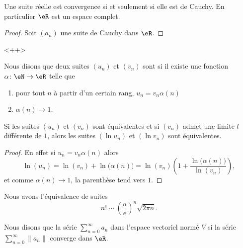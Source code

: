 \begin{theorem}  \label{ThoHGyzAva}
    Une suite réelle est convergence si et seulement si elle est de Cauchy. En particulier \( \eR\) est un espace complet.
\end{theorem}

\begin{proof}
    Soit \( (a_n)\) une suite de Cauchy dans \( \eR\).   
\end{proof}
<++>

\begin{definition}
    Nous disons que deux suites \( (u_n)\) et \( (v_n)\) sont  si il existe une fonction \( \alpha\colon \eN\to \eR\) telle que
    \begin{enumerate}
        \item
            pour tout \( n\) à partir d'un certain rang, \( u_n=v_n\alpha(n)\)
        \item
            \( \alpha(n)\to 1\).
    \end{enumerate}
\end{definition}

\begin{lemma}
    Si les suites \( (u_n)\) et \( (v_n)\) sont équivalentes et si \( (v_n)\) admet une limite \( l\) différente de \( 1\), alors les suites \( (\ln u_n)\) et \( (\ln v_n)\) sont équivalentes.
\end{lemma}

\begin{proof}
    En effet si \( u_n=v_n\alpha(n)\) alors
    \begin{equation}
        \ln(u_n)=\ln(v_n)+\ln\big( \alpha(n) \big)=\ln(v_n)\left( 1+\frac{ \ln\big( \alpha(n) \big) }{ \ln(v_n) } \right),
    \end{equation}
    et comme \( \alpha(n)\to 1\), la parenthèse tend vers \( 1\).
\end{proof}

\begin{lemma}        \label{LemCEoBqrP}
    Nous avons l'équivalence de suites
    \begin{equation}
        n!\sim \left( \frac{ n }{ e } \right)^n\sqrt{2\pi n}.
    \end{equation}
\end{lemma}

\begin{definition} \label{DefVFUIXwU}
    Nous disons que la série \( \sum_{n=0}^{\infty}a_n\) dans l'espace vectoriel normé \( V\)  si la série \( \sum_{n=0}^{\infty}\| a_n \|\) converge dans \( \eR\).
\end{definition}

